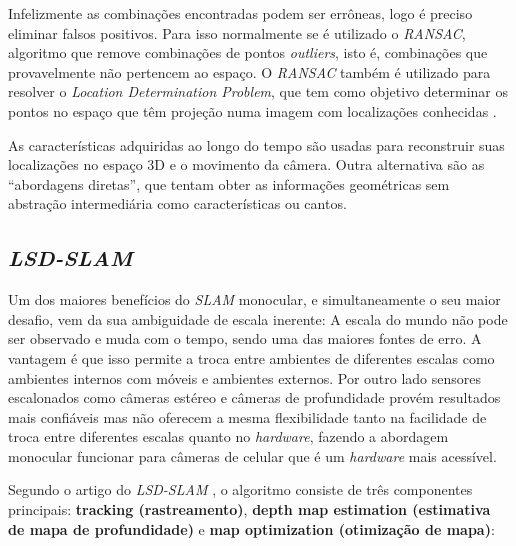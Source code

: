 Infelizmente as combinações encontradas podem ser errôneas, logo é preciso eliminar falsos positivos. Para isso normalmente se é utilizado o \textit{RANSAC}, algoritmo que remove combinações de pontos \textit{outliers}, isto é, combinações que provavelmente não pertencem ao espaço. O \textit{RANSAC} também é utilizado para resolver o \textit{Location Determination Problem}, que tem como objetivo determinar os pontos no espaço que têm projeção numa imagem com localizações conhecidas \cite{RANSAC}.

As características adquiridas ao longo do tempo são usadas para reconstruir suas localizações no espaço 3D e o movimento da câmera. Outra alternativa são as “abordagens diretas”, que tentam obter as informações geométricas sem abstração intermediária como características ou cantos.


\subsection{\textit{LSD-SLAM}}

Um dos maiores benefícios do \textit{SLAM} monocular, e simultaneamente o seu maior desafio, vem da sua ambiguidade de escala inerente: A escala do mundo não pode ser observado e muda com o tempo, sendo uma das maiores fontes de erro. A vantagem é que isso permite a troca entre ambientes de diferentes escalas como ambientes internos com móveis e ambientes externos. Por outro lado sensores escalonados como câmeras estéreo e câmeras de profundidade provém resultados mais confiáveis mas não oferecem a mesma flexibilidade tanto na facilidade de troca entre diferentes escalas quanto no \textit{hardware}, fazendo a abordagem monocular funcionar para câmeras de celular que é um \textit{hardware} mais acessível. 

Segundo o artigo do \textit{LSD-SLAM} \cite{LSD-SLAM-Artigo}, o algoritmo consiste de três componentes principais: \textbf{tracking (rastreamento)}, \textbf{depth map estimation (estimativa de mapa de profundidade)} e \textbf{map optimization (otimização de mapa)}:

